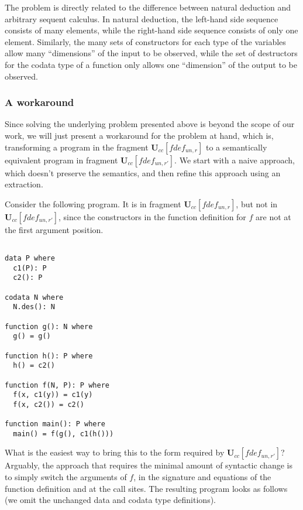 The problem is directly related to the difference between natural deduction and arbitrary sequent calculus. In natural deduction, the left-hand side sequence consists of many elements, while the right-hand side sequence consists of only one element. Similarly, the many sets of constructors for each type of the variables allow many ``dimensions'' of the input to be observed, while the set of destructors for the codata type of a function only allows one ``dimension'' of the output to be observed.

\subsubsection{A workaround}

Since solving the underlying problem presented above is beyond the scope of our work, we will just present a workaround for the problem at hand, which is, transforming a program in the fragment $\mathbf{U}_{cc}[fdef_{un,r}]$ to a semantically equivalent program in fragment $\mathbf{U}_{cc}[fdef_{un,r'}]$. We start with a naive approach, which doesn't preserve the semantics, and then refine this approach using an extraction.

Consider the following program. It is in fragment $\mathbf{U}_{cc}[fdef_{un,r}]$, but not in $\mathbf{U}_{cc}[fdef_{un,r'}]$, since the constructors in the function definition for $f$ are not at the first argument position.

\begin{lstlisting}

data P where
  c1(P): P
  c2(): P

codata N where
  N.des(): N

function g(): N where
  g() = g()

function h(): P where
  h() = c2()

function f(N, P): P where
  f(x, c1(y)) = c1(y)
  f(x, c2()) = c2()

function main(): P where
  main() = f(g(), c1(h()))

\end{lstlisting}

What is the easiest way to bring this to the form required by $\mathbf{U}_{cc}[fdef_{un,r'}]$? Arguably, the approach that requires the minimal amount of syntactic change is to simply switch the arguments of $f$, in the signature and equations of the function definition and at the call sites. The resulting program looks as follows (we omit the unchanged data and codata type definitions).

